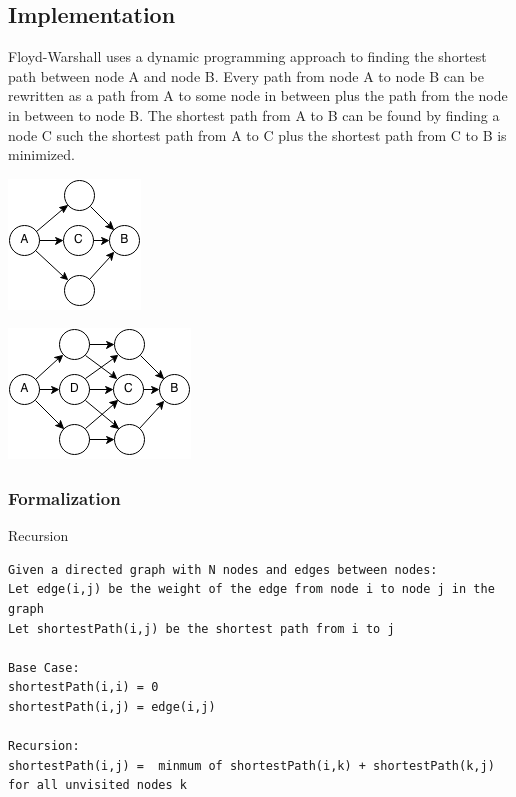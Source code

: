 \documentclass[11pt,oneside]{book}
\makeatletter
\def\maxwidth#1{\ifdim\Gin@nat@width>#1 #1\else\Gin@nat@width\fi}
\makeatother
\begin{document}
\subsection{Implementation}

Floyd-Warshall uses a dynamic programming approach to finding the shortest path between node A and node B. Every path from node A to node B can be rewritten as a path from A to some node in between plus the path from the node in between to node B. The shortest path from A to B can be found by finding a node C such the shortest path from A to C plus the shortest path from C to B is minimized.

\vspace{5px}\includegraphics[width=\maxwidth{\textwidth}]{floydwarshall1.png}

\vspace{5px}\includegraphics[width=\maxwidth{\textwidth}]{floydwarshall.png}

\subsubsection{Formalization}

Recursion

\begin{lstlisting}
Given a directed graph with N nodes and edges between nodes:
Let edge(i,j) be the weight of the edge from node i to node j in the graph
Let shortestPath(i,j) be the shortest path from i to j

Base Case:
shortestPath(i,i) = 0
shortestPath(i,j) = edge(i,j)

Recursion:
shortestPath(i,j) =  minmum of shortestPath(i,k) + shortestPath(k,j) for all unvisited nodes k
\end{lstlisting}
\end{document}

